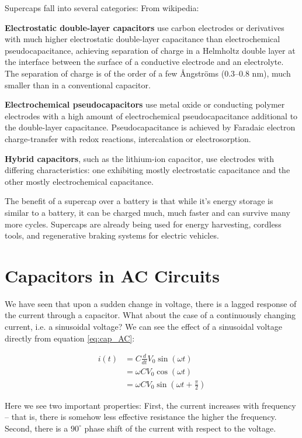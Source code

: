 \documentclass{tufte-book}
\begin{document}
\noindent Supercaps fall into several categories: From wikipedia:

\noindent\textbf{Electrostatic double-layer capacitors} use carbon electrodes or derivatives with much higher electrostatic double-layer capacitance than electrochemical pseudocapacitance, achieving separation of charge in a Helmholtz double layer at the interface between the surface of a conductive electrode and an electrolyte. The separation of charge is of the order of a few \r{A}ngstr{\"o}ms (0.3--0.8 nm), much smaller than in a conventional capacitor.

\noindent\textbf{Electrochemical pseudocapacitors} use metal oxide or conducting polymer electrodes with a high amount of electrochemical pseudocapacitance additional to the double-layer capacitance. Pseudocapacitance is achieved by Faradaic electron charge-transfer with redox reactions, intercalation or electrosorption.

\noindent\textbf{Hybrid capacitors}, such as the lithium-ion capacitor, use electrodes with differing characteristics: one exhibiting mostly electrostatic capacitance and the other mostly electrochemical capacitance.

The benefit of a supercap over a battery is that while it's energy storage is similar to a battery, it can be charged much, much faster and can survive many more cycles. Supercaps are already being used for energy harvesting, cordless tools, and regenerative braking systems for electric vehicles.

\section{Capacitors in AC Circuits}
We have seen that upon a sudden change in voltage, there is a lagged response of the current through a capacitor. What about the case of a continuously changing current, i.e. a sinusoidal voltage? We can see the effect of a sinusoidal voltage directly from equation \ref{eq:cap_AC}:

\begin{align}\label{eq:ac_cap_deriv}
i(t) &= C\frac{d}{dt}V_0\sin\left(\omega t\right) \nonumber\\
     &= \omega C V_0\cos\left(\omega t\right) \nonumber\\
     &= \omega C V_0\sin\left(\omega t + \frac{\pi}{2}\right)
\end{align}

\noindent Here we see two important properties: First, the current increases with frequency -- that is, there is somehow less effective resistance the higher the frequency. Second, there is a $90^\circ$ phase shift of the current with respect to the voltage.
\end{document}
